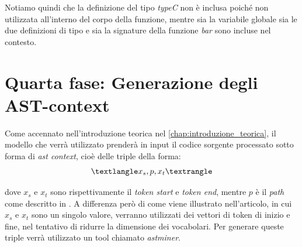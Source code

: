Notiamo quindi che la definizione del tipo \textit{typeC} non è inclusa poiché non utilizzata all'interno del corpo della funzione, mentre sia la variabile globale sia le due definizioni di tipo e sia la signature della funzione \textit{bar} sono incluse nel contesto.


\section{Quarta fase: Generazione degli AST-context}
Come accennato nell'introduzione teorica nel \autoref{chap:introduzione_teorica}, il modello che verrà utilizzato prenderà in input il codice sorgente processato sotto forma di \textit{ast context}, cioè delle triple della forma:
  \[\anglebra{x_s, p, x_t}\]

dove $x_s$ e $x_t$ sono rispettivamente il \textit{token start} e \textit{token end}, mentre $p$ è il \textit{path} come descritto in \cite{alon2019code2vec}.
A differenza però di come viene illustrato nell'articolo, in cui $x_s$ e $x_t$ sono un singolo valore, verranno utilizzati dei vettori di token di inizio e fine, nel tentativo di ridurre la dimensione dei vocabolari.
Per generare queste triple verrà utilizzato un tool chiamato \textit{astminer}.

